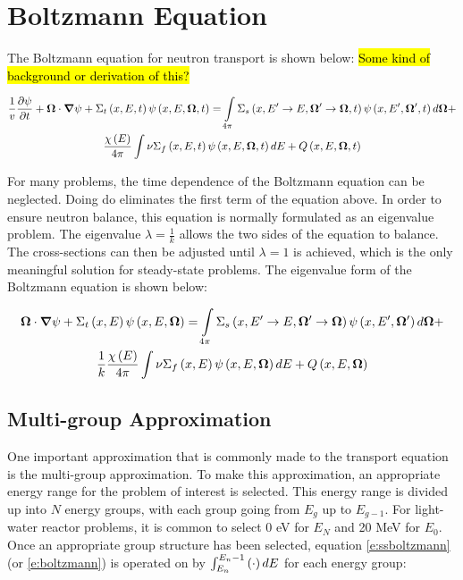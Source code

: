 \section{Boltzmann Equation}

The Boltzmann equation for neutron transport is shown below: \hl{Some kind of background or derivation of this?}

\begin{gather}\label{e:boltzmann}
\frac{1}{v} \frac{\partial \psi}{\partial t} + \bm \Omega \cdot \bm \nabla \psi + \Sigma_t\left(x,E,t\right)\psi\left(x,E,\bm \Omega,t\right) = \intop_{4\pi} \Sigma_s\left(x,E' \rightarrow E, \bm \Omega' \rightarrow \bm \Omega, t\right) \psi\left(x,E',\bm \Omega',t\right) d\bm \Omega + \nonumber\\
\frac{\chi\left(E\right)}{4\pi} \intop \nu \Sigma_f\left(x,E,t\right) \psi\left(x,E,\bm \Omega,t\right) dE + Q\left(x,E,\bm \Omega,t\right)
\end{gather}

For many problems, the time dependence of the Boltzmann equation can be neglected.  Doing do eliminates the first term of the equation above.  In order to ensure neutron balance, this equation is normally formulated as an eigenvalue problem.  The eigenvalue $\lambda = \frac{1}{k}$ allows the two sides of the equation to balance.  The cross-sections can then be adjusted until $\lambda = 1$ is achieved, which is the only meaningful solution for steady-state problems.  The eigenvalue form of the Boltzmann equation is shown below:

\begin{gather}\label{e:ssboltzmann}
\bm \Omega \cdot \bm \nabla \psi + \Sigma_t\left(x,E\right)\psi\left(x,E,\bm \Omega\right) = \intop_{4\pi} \Sigma_s\left(x,E' \rightarrow E, \bm \Omega' \rightarrow \bm \Omega\right) \psi\left(x,E',\bm \Omega'\right) d\bm \Omega + \nonumber\\
\frac{1}{k}\frac{\chi\left(E\right)}{4\pi} \intop \nu \Sigma_f\left(x,E\right) \psi\left(x,E,\bm \Omega\right) dE + Q\left(x,E,\bm \Omega\right)
\end{gather}

\subsection{Multi-group Approximation}

One important approximation that is commonly made to the transport equation is the multi-group approximation.  To make this approximation, an appropriate energy range for the problem of interest is selected.  This energy range is divided up into $N$ energy groups, with each group going from $E_g$ up to $E_{g-1}$.  For light-water reactor problems, it is common to select 0 eV for $E_N$ and 20 MeV for $E_0$.  Once an appropriate group structure has been selected, equation \ref{e:ssboltzmann} (or \ref{e:boltzmann}) is operated on by $\intop_{E_n}^{E_n-1}\left(\cdot\right)dE$ for each energy group:

